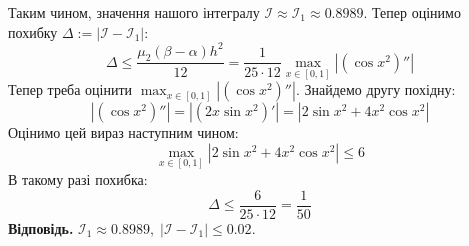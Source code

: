 \documentclass[14pt]{extarticle}
\begin{document}
Таким чином, значення нашого інтегралу $\mathcal{I} \approx \mathcal{I}_1 \approx 0.8989$. Тепер оцінимо похибку $\Delta := |\mathcal{I} - \mathcal{I}_1|$:
\[
\Delta \leq \frac{\mu_2(\beta-\alpha)h^2}{12} = \frac{1}{25 \cdot 12} \max_{x \in [0,1]}|(\cos x^2)''|
\]
Тепер треба оцінити $\max_{x \in [0,1]}|(\cos x^2)''|$. Знайдемо другу похідну:
\[
|(\cos x^2)''| = |(2x \sin x^2)'| = |2\sin x^2 + 4x^2 \cos x^2|
\]
Оцінимо цей вираз наступним чином:
\[
\max_{x \in [0,1]}|2\sin x^2 + 4x^2\cos x^2| \leq 6
\]
В такому разі похибка:
\[
\Delta \leq \frac{6}{25 \cdot 12} = \frac{1}{50}
\]
\textbf{Відповідь.} $\mathcal{I}_1 \approx 0.8989, \; |\mathcal{I}-\mathcal{I}_1| \leq 0.02$. 
\end{document}

